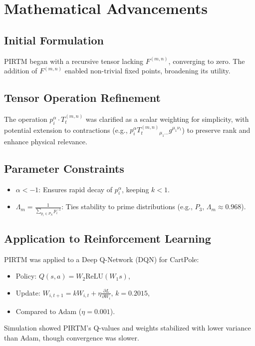 \documentclass{article}
\theoremstyle{plain}
\begin{document}
 \section{Mathematical Advancements}
 \subsection{Initial Formulation}
PIRTM began with a recursive tensor lacking \( F^{(m,n)} \), converging to zero. The addition of \( F^{(m,n)} \) enabled non-trivial fixed points, broadening its utility.

 \subsection{Tensor Operation Refinement}
The operation \( p_i^\alpha \cdot T_t^{(m,n)} \) was clarified as a scalar weighting for simplicity, with potential extension to contractions (e.g., \( p_i^\alpha T_t^{(m,n)}{}_{\mu_1 \dots} g^{\mu_1 \nu_1} \)) to preserve rank and enhance physical relevance.

 \subsection{Parameter Constraints}
\begin{itemize}
    \item \( \alpha < -1 \): Ensures rapid decay of \( p_i^\alpha \), keeping \( k < 1 \).
    \item \( \Lambda_m = \frac{1}{\sum_{p_i \in P_N} p_i^{-1}} \): Ties stability to prime distributions (e.g., \( P_3 \), \( \Lambda_m \approx 0.968 \)).
\end{itemize}

 \subsection{Application to Reinforcement Learning}
PIRTM was applied to a Deep Q-Network (DQN) for CartPole:
\begin{itemize}
    \item Policy: \( Q(s, a) = W_2 \text{ReLU}(W_1 s) \),
    \item Update: \( W_{i,t+1} = k W_{i,t} + \eta \frac{\partial L}{\partial W_i} \), \( k = 0.2015 \),
    \item Compared to Adam (\( \eta = 0.001 \)).
\end{itemize}
Simulation showed PIRTM’s Q-values and weights stabilized with lower variance than Adam, though convergence was slower.
\end{document}
